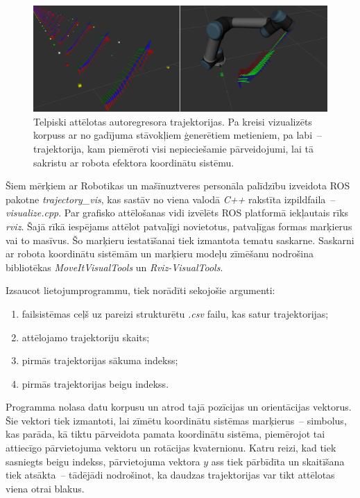 \documentclass[12pt, a4paper]{article}
\numberwithin{equation}{section} %
\begin{document}
\begin{figure}[t!]
    \centering
    \includegraphics[width=16cm,page=1]{../img/trajectory_vis.png}
    \caption{Telpiski attēlotas autoregresora trajektorijas. Pa kreisi vizualizēts korpuss ar no gadījuma stāvokļiem ģenerētiem metieniem, pa labi~-- trajektorija, kam piemēroti visi nepieciešamie pārveidojumi, lai tā sakristu ar robota efektora koordinātu sistēmu.}
\end{figure}

Šiem mērķiem ar Robotikas un mašīnuztveres personāla palīdzību izveidota ROS pakotne \textit{trajectory\_vis}, kas sastāv no viena valodā \textit{C++} rakstīta izpildfaila~-- \textit{visualize.cpp}. Par grafisko attēlošanas vidi izvēlēts ROS platformā iekļautais rīks \textit{rviz}. Šajā rīkā iespējams attēlot patvaļīgi novietotus, patvaļīgas formas marķierus vai to masīvus. Šo marķieru iestatīšanai tiek izmantota tematu saskarne. Saskarni ar robota koordinātu sistēmām un marķieru modeļu zīmēšanu nodrošina bibliotēkas \textit{MoveItVisualTools} un \textit{Rviz-VisualTools}. 

Izsaucot lietojumprogrammu, tiek norādīti sekojošie argumenti:

\begin{enumerate}
    \item failsistēmas ceļš uz pareizi strukturētu \textit{.csv} failu, kas satur trajektorijas;
    \item attēlojamo trajektoriju skaits;
    \item pirmās trajektorijas sākuma indekss;
    \item pirmās trajektorijas beigu indekss.
\end{enumerate}

Programma nolasa datu korpusu un atrod tajā pozīcijas un orientācijas vektorus. Šie vektori tiek izmantoti, lai zīmētu koordinātu sistēmas marķierus~-- simbolus, kas parāda, kā tiktu pārveidota pamata koordinātu sistēma, piemērojot tai attiecīgo pārvietojuma vektoru un rotācijas kvaternionu. Katru reizi, kad tiek sasniegts beigu indekss, pārvietojuma vektora $y$ ass tiek pārbīdīta un skaitīšana tiek atsākta~-- tādējādi nodrošinot, ka daudzas trajektorijas var tikt attēlotas viena otrai blakus. 
\end{document}
